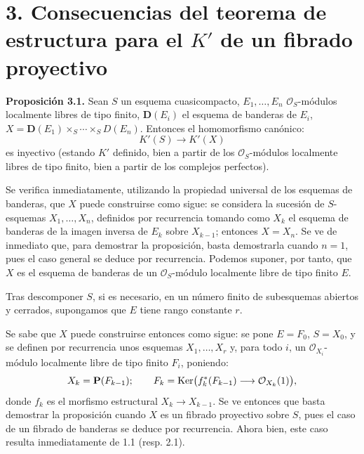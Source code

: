 \providecommand{\sisi}[2]{#2}

\section*{3. Consecuencias del teorema de estructura para el \(K'\) de un fibrado proyectivo}

\textbf{Proposición 3.1.} Sean \(S\) un esquema cuasicompacto, \(E_1,\ldots,E_n\) \(\mathcal O_S\)-módulos localmente libres de tipo finito, \(\mathbf D(E_i)\) el esquema de banderas de \(E_i\), \(X=\mathbf D(E_1)\times_S\cdots\times_S D(E_n)\).
Entonces el homomorfismo canónico:
\[
  K'(S)\longrightarrow K'(X)
\]
es inyectivo (estando \(K'\) definido, bien a partir de los \(\mathcal O_S\)-módulos localmente libres de tipo finito, bien a partir de los complejos perfectos).

Se verifica inmediatamente, utilizando la propiedad universal de los esquemas de banderas, que \(X\) puede construirse como sigue: se considera la sucesión de \(S\)-esquemas \(X_1,\ldots,X_n\), definidos por recurrencia tomando como \(X_k\) el esquema de banderas de la imagen inversa de \(E_k\) sobre \(X_{k-1}\); entonces \(X=X_n\). Se ve de inmediato que, para demostrar la proposición, basta demostrarla cuando \(n=1\), pues el caso general se deduce por recurrencia. Podemos suponer, por tanto, que \(X\) es el esquema de banderas de un \(\mathcal O_S\)-módulo localmente libre de tipo finito \(E\).

\sisi{}{Tras descomponer \(S\), si es necesario, en un número finito de
subesquemas abiertos y cerrados, supongamos que \(E\) tiene rango constante
\(r\).} %

Se sabe que \(X\) puede construirse entonces como sigue: se pone \(E=F_0\), \(S=X_0\), y se definen por recurrencia unos esquemas \(X_1,\ldots,X_{\sisi{n}{r}}\) y, para todo \(i\), un \(\mathcal O_{X_i}\)-módulo localmente libre de tipo finito \(F_i\), poniendo:
\[
  X_k=\mathbf P(F_{k-1});\qquad
  F_k=\operatorname{Ker}\bigl(f_k^*(F_{k-1})\longrightarrow \mathcal O_{X_k}(1)\bigr),
\]
donde \(f_k\) es el morfismo estructural \(X_k\to X_{k-1}\). Se ve entonces que basta demostrar la proposición cuando \(X\) es un fibrado proyectivo sobre \(S\), pues el caso de un fibrado de banderas se deduce por recurrencia. Ahora bien, este caso resulta inmediatamente de 1.1 (resp. 2.1).

